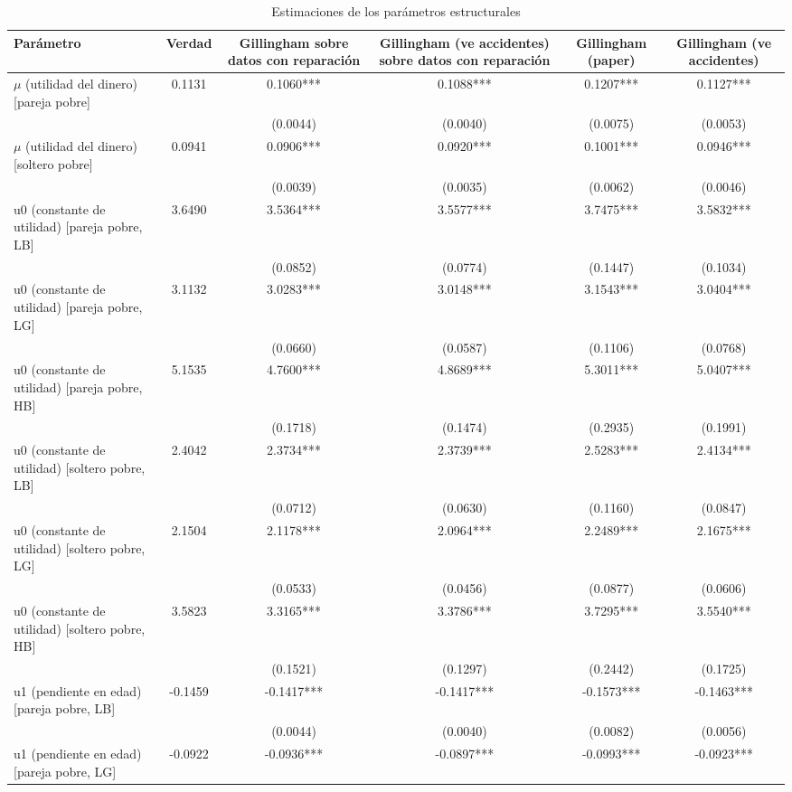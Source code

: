 \begin{table}[htbp]
\centering
\caption{Estimaciones de los parámetros estructurales}
\begin{tabular}{lccccc}
\toprule
Parámetro & Verdad & Gillingham sobre datos con reparación & Gillingham (ve accidentes) sobre datos con reparación & Gillingham (paper) & Gillingham (ve accidentes) \\
\midrule
$\mu$ (utilidad del dinero) [pareja pobre] & 0.1131 & 0.1060*** & 0.1088*** & 0.1207*** & 0.1127*** \\
 &  & (0.0044) & (0.0040) & (0.0075) & (0.0053) \\
$\mu$ (utilidad del dinero) [soltero pobre] & 0.0941 & 0.0906*** & 0.0920*** & 0.1001*** & 0.0946*** \\
 &  & (0.0039) & (0.0035) & (0.0062) & (0.0046) \\
u0 (constante de utilidad) [pareja pobre, LB] & 3.6490 & 3.5364*** & 3.5577*** & 3.7475*** & 3.5832*** \\
 &  & (0.0852) & (0.0774) & (0.1447) & (0.1034) \\
u0 (constante de utilidad) [pareja pobre, LG] & 3.1132 & 3.0283*** & 3.0148*** & 3.1543*** & 3.0404*** \\
 &  & (0.0660) & (0.0587) & (0.1106) & (0.0768) \\
u0 (constante de utilidad) [pareja pobre, HB] & 5.1535 & 4.7600*** & 4.8689*** & 5.3011*** & 5.0407*** \\
 &  & (0.1718) & (0.1474) & (0.2935) & (0.1991) \\
u0 (constante de utilidad) [soltero pobre, LB] & 2.4042 & 2.3734*** & 2.3739*** & 2.5283*** & 2.4134*** \\
 &  & (0.0712) & (0.0630) & (0.1160) & (0.0847) \\
u0 (constante de utilidad) [soltero pobre, LG] & 2.1504 & 2.1178*** & 2.0964*** & 2.2489*** & 2.1675*** \\
 &  & (0.0533) & (0.0456) & (0.0877) & (0.0606) \\
u0 (constante de utilidad) [soltero pobre, HB] & 3.5823 & 3.3165*** & 3.3786*** & 3.7295*** & 3.5540*** \\
 &  & (0.1521) & (0.1297) & (0.2442) & (0.1725) \\
u1 (pendiente en edad) [pareja pobre, LB] & -0.1459 & -0.1417*** & -0.1417*** & -0.1573*** & -0.1463*** \\
 &  & (0.0044) & (0.0040) & (0.0082) & (0.0056) \\
u1 (pendiente en edad) [pareja pobre, LG] & -0.0922 & -0.0936*** & -0.0897*** & -0.0993*** & -0.0923*** \\

\end{tabular}
\end{table}
